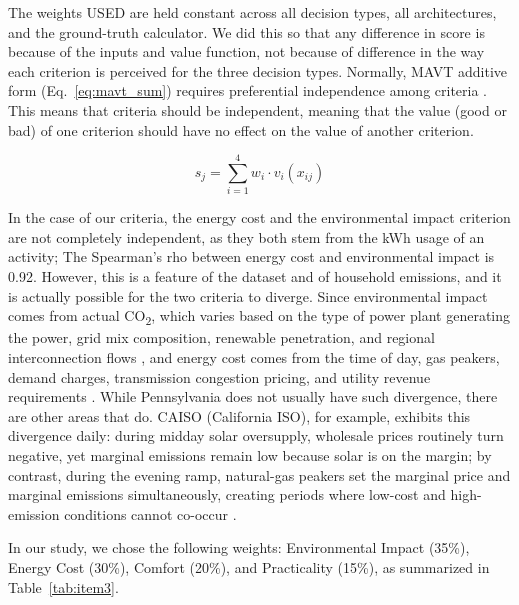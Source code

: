 \documentclass[a4paper,fleqn]{cas-dc}
\begin{document}
The weights USED are held constant across all decision types, all architectures, and the ground-truth calculator. We did this so that any difference in score is because of the inputs and value function, not because of difference in the way each criterion is perceived for the three decision types. Normally, MAVT additive form (Eq.~\ref{eq:mavt_sum}) requires preferential independence among criteria \citep{dyer1979,keeneyraiffa1976}. This means that criteria should be independent, meaning that the value (good or bad) of one criterion should have no effect on the value of another criterion.

\begin{equation}
\label{eq:mavt_sum}
s_j = \sum_{i=1}^{4} w_i \cdot v_i(x_{ij})
\end{equation}

In the case of our criteria, the energy cost and the environmental impact criterion are not completely independent, as they both stem from the kWh usage of an activity; The Spearman's rho between energy cost and environmental impact is 0.92. However, this is a feature of the dataset and of household emissions, and it is actually possible for the two criteria to diverge. Since environmental impact comes from actual CO\textsubscript{2}, which varies based on the type of power plant generating the power, grid mix composition, renewable penetration, and regional interconnection flows \citep{pjm2022emissions}, and energy cost comes from the time of day, gas peakers, demand charges, transmission congestion pricing, and utility revenue requirements \citep{peco2021}. While Pennsylvania does not usually have such divergence, there are other areas that do. CAISO (California ISO), for example, exhibits this divergence daily: during midday solar oversupply, wholesale prices routinely turn negative, yet marginal emissions remain low because solar is on the margin; by contrast, during the evening ramp, natural-gas peakers set the marginal price and marginal emissions simultaneously, creating periods where low-cost and high-emission conditions cannot co-occur \citep{caiso2025duck,ascend2025}.

In our study, we chose the following weights: Environmental Impact (35\%), Energy Cost (30\%), Comfort (20\%), and Practicality (15\%), as summarized in Table~\ref{tab:item3}.
\end{document}
